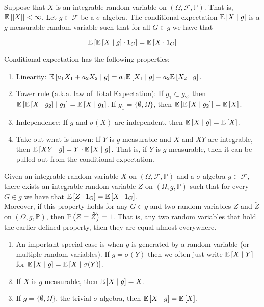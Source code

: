 \documentclass[english, course]{Notes}
\begin{document}
\begin{definition}
	Suppose that $X$ is an integrable random variable on $(\Omega, \mathcal{F}, \mathbb{P})$. That is, $\mathbb{E}\left[|X|\right] < \infty$. Let $g \subset \mathcal{F}$ be a $\sigma$-algebra. The conditional expectation $\mathbb{E}\left[X \mid g\right]$ is a $g$-measurable random variable such that for all $G \in g$ we have that
	
	\[\mathbb{E}\left[\mathbb{E}\left[X \mid g\right] \cdot 1_G\right] = \mathbb{E}\left[X \cdot 1_G\right]\]
	
	Conditional expectation has the following properties:
	
	\begin{enumerate}
		\item Linearity: $\mathbb{E}\left[a_1X_1 + a_2X_2 \mid g\right] = a_1 \mathbb{E}\left[X_1 \mid g\right] + a_2 \mathbb{E}\left[X_2 \mid g\right]$.
		\item Tower rule (a.k.a. law of Total Expectation): If $g_1 \subset g_2$, then $\mathbb{E}\left[\mathbb{E}\left[X \mid g_2\right] \mid g_1\right] = \mathbb{E}\left[X \mid g_1\right]$. If $g_1 = \{\emptyset, \Omega\}$, then $\mathbb{E}\left[\mathbb{E}\left[X \mid g_2\right]\right] = \mathbb{E}\left[X\right]$.
		\item Independence: If $g$ and $\sigma(X)$ are independent, then $\mathbb{E}\left[X \mid g\right] = \mathbb{E}\left[X\right]$.
		\item Take out what is known: If $Y$ is $g$-measurable and $X$ and $XY$ are integrable, then $\mathbb{E}\left[XY \mid g\right] = Y\cdot \mathbb{E}\left[X \mid g\right]$. That is, if $Y$ is $g$-measurable, then it can be pulled out from the conditional expectation.
	\end{enumerate}
	
\end{definition}

\begin{theorem}
	Given an integrable random variable $X$ on $(\Omega, \mathcal{F}, \mathbb{P})$ and a $\sigma$-algebra $g \subset \mathcal{F}$, there exists an integrable random variable $Z$ on $(\Omega, g, \mathbb{P})$ such that for every $G \in g$ we have that $\mathbb{E}\left[Z \cdot 1_G\right] = \mathbb{E}\left[X \cdot 1_G\right]$.\\
	
	Moreover, if this property holds for any $G \in g$ and two random variables $Z$ and $\tilde{Z}$ on $(\Omega, g, \mathbb{P})$, then $\mathbb{P}\left(Z = \tilde{Z}\right) = 1$. That is, any two random variables that hold the earlier defined property, then they are equal almost everywhere.
\end{theorem}

\begin{remark}
	\begin{enumerate}
		\item An important special case is when $g$ is generated by a random variable (or multiple random variables). If $g = \sigma(Y)$ then we often just write $\mathbb{E}\left[X \mid Y\right]$ for $\mathbb{E}\left[X \mid g\right] = \mathbb{E}\left[X \mid \sigma(Y)\right]$.
		\item If $X$ is $g$-measurable, then $\mathbb{E}\left[X \mid g\right] = X$.
		\item If $g = \{\emptyset, \Omega\}$, the trivial $\sigma$-algebra, then $\mathbb{E}\left[X \mid g\right] = \mathbb{E}\left[X\right]$.
	\end{enumerate}
\end{remark}
\end{document}
